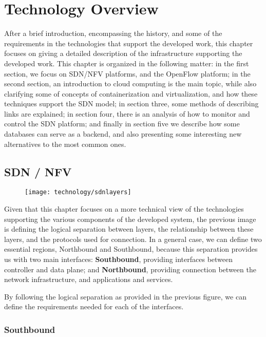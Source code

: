 \chapter{Technology Overview} \label{chap:tech} %
\hspace {5mm}

After a brief introduction, encompassing the history, and some of the requirements in the technologies that support the developed work, this chapter focuses on giving a detailed description of the infrastructure supporting 
the developed work. This chapter is organized in the following matter: in the first section, we focus on SDN/NFV platforms, and the OpenFlow platform; in the second section, an introduction to cloud computing is the main topic,
while also clarifying some of concepts of containerization and virtualization, and how these techniques support the SDN model; in section three, some methods of describing links are explained; in section four, there is an 
analysis of how to monitor and control the SDN platform; and finally in section five we describe how some databases can serve as a backend, and also presenting some interesting new alternatives to the most common ones.

\section {SDN / NFV}

\begin{figure}[!tbph]
  \centering
  {\texttt{[image: technology/sdnlayers]}\label{fig:net_trad}}
\end{figure}

Given that this chapter focuses on a more technical view of the technologies supporting the various components of the developed system, the previous image is defining the logical separation between layers, the relationship between 
these layers, and the protocols used for connection. In a general case, we can define two essential regions, Northbound and Southbound, because this separation provides us with two main interfaces: \textbf{Southbound}, 
providing interfaces between controller and data plane; and \textbf{Northbound}, providing connection between the network infrastructure, and applications and services.

\par By following the logical separation as provided in the previous figure, we can define the requirements needed for each of the interfaces.

\subsection {Southbound}
